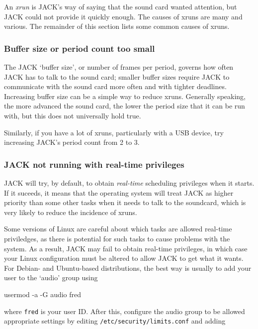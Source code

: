 \documentclass[10pt,a4paper]{book}
\begin{document}
An \emph{xrun}  is JACK's way of saying that the sound
card wanted attention, but JACK could not provide it quickly enough.
The causes of xruns are many and various.  The remainder of this
section lists some common causes of xruns.


\subsubsection{Buffer size or period count too small}

The JACK `buffer size', or number of frames per period, governs how
often JACK has to talk to the sound card; smaller buffer sizes require
JACK to communicate with the sound card more often and with tighter
deadlines.  Increasing buffer size can be a simple way to reduce
xruns.  Generally speaking, the more advanced the sound card, the
lower the period size that it can be run with, but this does not
universally hold true.

Similarly, if you have a lot of xruns, particularly with a USB device,
try increasing JACK's period count from 2 to 3.


\subsubsection{JACK not running with real-time privileges}

JACK will try, by default, to obtain \emph{real-time} scheduling
privileges when it starts.  If it suceeds, it means that the
operating system will treat JACK as higher priority than some other
tasks when it needs to talk to the soundcard, which is very likely to
reduce the incidence of xruns.

Some versions of Linux are careful about which tasks are allowed
real-time priviledges, as there is potential for such tasks to cause
problems with the system.  As a result, JACK may fail to obtain
real-time privileges, in which case your Linux configuration must be
altered to allow JACK to get what it wants.  For Debian- and
Ubuntu-based distributions, the best way is usually to add your user
to the `audio' group using

\begin{listing}
usermod -a -G audio fred
\end{listing}

where \texttt{fred} is your user ID\@.  After this, configure the audio
group to be allowed appropriate settings by editing
\texttt{/etc/security/limits.conf} and adding
\end{document}
